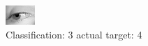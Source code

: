 \begin{figure}[h!]
\begin{center}
\includegraphics[width=0.60\columnwidth]{figures/ID2990_class_3_target_4.png}
\end{center}
\caption{ Classification: 3 actual target: 4}
\label{fig:ID2990_class_3_target_4}
\end{figure}
